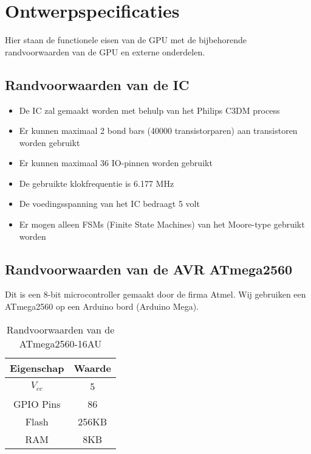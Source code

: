 \documentclass{scrreprt} %
\date{22 november 2013}
\begin{document}
\chapter{Ontwerpspecificaties}
Hier staan de functionele eisen van de GPU met de bijbehorende randvoorwaarden van de GPU en externe onderdelen.

\section {Randvoorwaarden van de IC}
\begin {itemize}
\item De IC zal gemaakt worden met behulp van het Philips C3DM process \cite{epo3-manual}
\item Er kunnen maximaal 2 bond bars (40000 transistorparen) aan transistoren worden gebruikt
\item Er kunnen maximaal 36 IO-pinnen worden gebruikt
\item De gebruikte klokfrequentie is 6.177 MHz
\item De voedingsspanning van het IC bedraagt 5 volt
\item Er mogen alleen FSMs (Finite State Machines) van het Moore-type gebruikt worden
\end {itemize}

\section {Randvoorwaarden van de AVR ATmega2560}
Dit is een 8-bit microcontroller gemaakt door de firma Atmel. Wij gebruiken een ATmega2560 op een Arduino bord (Arduino Mega).
\begin{table}[H]
\centering
\caption{Randvoorwaarden van de ATmega2560-16AU}
\label{tab:spec-avr}
\begin{tabular}{c c}
	\hline\hline
 	Eigenschap & Waarde\\
 	\hline
	$V_{cc}$ & 5\volt \\
	GPIO Pins & 86 \\
	Flash & 256KB \\
	RAM & 8KB \\
  	\hline
\end{tabular}
\end{table}
\end{document}
